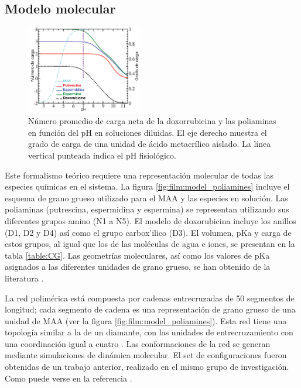 

\subsection{Modelo molecular}
\label{sub:film:modelo-molecular}


\begin{figure}[ht]
	\centering
	\includegraphics[width=0.45\textwidth]{Figures/graph-film/chargeAds.pdf}
	\caption{N\'umero promedio de carga neta de la doxorrubicina y las poliaminas en funci\'on del pH en soluciones diluidas.
		El eje derecho muestra el grado de carga de una unidad de \'acido metacr\'ilico aislado. La l\'inea vertical punteada indica el pH fisiol\'ogico.}
	\label{fig:film:model}
\end{figure}


Este formalismo te\'orico requiere una representaci\'on molecular de todas las especies qu\'imicas en el sistema. La figura \ref{fig:film:model_poliamines} incluye el esquema de grano grueso utilizado para el MAA y las especies en soluci\'on. Las poliaminas (putrescina, espermidina y espermina) se representan utilizando sus diferentes grupos amino (N1 a N5). El modelo de doxorubicina incluye los anillos (D1, D2 y D4) as\'i como el grupo carbox'ilico (D3). El volumen, pKa y carga de estos grupos, al igual que los de las mol\'eculas de agua e iones, se presentan en la tabla \ref{table:CG}. Las geometr\'ias moleculares, as\'i como los valores de pKa asignados a las diferentes unidades de grano grueso, se han obtenido de la literatura \cite{agostinelli2010polyamines,casero2009,puchem}.

La red polim\'erica est\'a compuesta por cadenas entrecruzadas de 50 segmentos de longitud; cada segmento de cadena es una representaci\'on de grano grueso de una unidad de MAA (ver la figura \ref{fig:film:model_poliamines}). Esta red tiene una topolog\'ia similar a la de un diamante, con las unidades de entrecruzamiento con una coordinaci\'on igual a cuatro  \cite{Mann2005,QuesadaPerez2012M,Kosovan2015,Hofzumahaus2018}. Las conformaciones de la red se generan mediante simulaciones de din\'amica molecular. El set de configuraciones fueron obtenidas de un trabajo anterior, realizado en el mismo grupo de investigaci\'on. Como puede verse en la referencia  \cite{hagemann2018use}.



